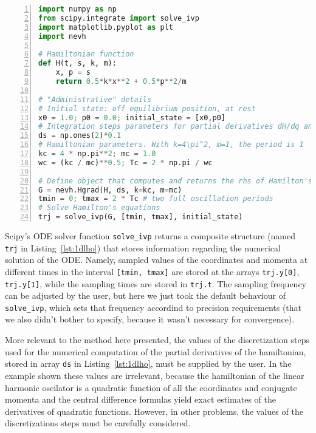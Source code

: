 \documentclass{iopart}
\begin{document}
\begin{lstlisting}[caption= {Numerical solution of Hamiltonian's equations for
the one-dimensional linear harmonic oscillator. Note that the user only supplies
code for the system's Hamilton function in lines 7-9. The remaining code lines
define initial state, physical and numerical parameters.},
numbers=left, stepnumber=1, label={lst:1dlho}, language=python
]
import numpy as np
from scipy.integrate import solve_ivp
import matplotlib.pyplot as plt
import nevh

# Hamiltonian function
def H(t, s, k, m):
    x, p = s
    return 0.5*k*x**2 + 0.5*p**2/m

# "Administrative" details
# Initial state: off equilibrium position, at rest
x0 = 1.0; p0 = 0.0; initial_state = [x0,p0]
# Integration steps parameters for partial derivatives dH/dq and dH/dp
ds = np.ones(2)*0.1
# Hamiltonian parameters. With k=4\pi^2, m=1, the period is 1
kc = 4 * np.pi**2; mc = 1.0
wc = (kc / mc)**0.5; Tc = 2 * np.pi / wc

# Define object that computes and returns the rhs of Hamilton's eqs
G = nevh.Hgrad(H, ds, k=kc, m=mc)
tmin = 0; tmax = 2 * Tc # two full oscillation periods
# Solve Hamilton's equations
trj = solve_ivp(G, [tmin, tmax], initial_state)
\end{lstlisting}
Scipy's ODE solver function \texttt{solve\_ivp} returns a composite structure
(named \texttt{trj} in Listing~\ref{lst:1dlho}) that stores information
regarding the numerical solution of the ODE. Namely, sampled values of the
coordinates and momenta at different times in the interval \texttt{[tmin, tmax]}
are stored at the arrays \texttt{trj.y[0]}, \texttt{trj.y[1]}, while the
sampling times are stored in \texttt{trj.t}. The sampling frequency can be
adjusted by the user, but here we just took the default behaviour of
\texttt{solve\_ivp}, which sets that frequency accordind to precision
requirements (that we also didn't bother to specify, because it wasn't necessary
for convergence). 


More relevant to the method here presented, the values of the discretization
steps used for the numerical computation of the partial derivatives of the
hamiltonian, stored in array \texttt{ds} in Listing~\ref{lst:1dlho}, must be
supplied by the user. In the example shown these values are irrelevant, because
the hamiltonian of the linear harmonic oscilator is a quadratic function of all
the coordinates and conjugate momenta and the central difference formulas
yield exact estimates of the derivatives of quadratic functions. However, in
other problems, the values of the discretizations steps must be carefully
considered.
\end{document}
